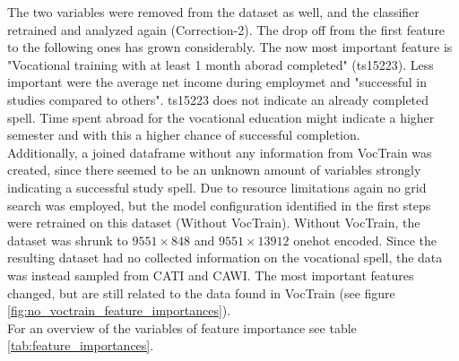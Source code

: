 The two variables were removed from the dataset as well, and the classifier retrained and analyzed again (Correction-2). The drop off from the first feature to the following ones has grown considerably. The now most important feature is "Vocational training with at least 1 month aborad completed" (ts15223). Less important were the average net income during employmet and "successful in studies compared to others". ts15223 does not indicate an already completed spell. Time spent abroad for the vocational education might indicate a higher semester and with this a higher chance of successful completion.\\
Additionally, a joined dataframe without any information from VocTrain was created, since there seemed to be an unknown amount of variables strongly indicating a successful study spell. Due to resource limitations again no grid search was employed, but the model configuration identified in the first steps were retrained on this dataset (Without VocTrain). Without VocTrain, the dataset was shrunk to $9551 \times 848$ and $9551 \times 13912$ onehot encoded. Since the resulting dataset had no collected information on the vocational spell, the data was instead sampled from CATI and CAWI. The most important features changed, but are still related to the data found in VocTrain (see figure \ref{fig:no_voctrain_feature_importances}).\\
For an overview of the variables of feature importance see table \ref{tab:feature_importances}.

